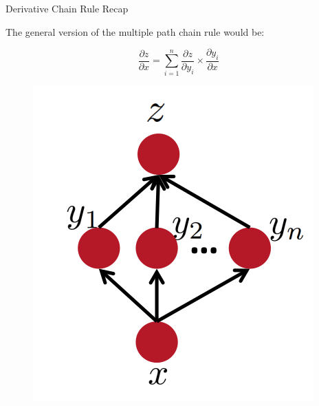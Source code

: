 \documentclass[handout]{beamer}
\begin{document}
\begin{frame}{Derivative Chain Rule Recap}

The general version of the multiple path chain rule would be:

\begin{displaymath}
 \frac{\partial z}{\partial x} = \sum_{i=1}^n \frac{\partial z}{\partial y_i} \times \frac{\partial y_i}{\partial x} 
\end{displaymath}


\begin{figure}[htb]
	\centering
	 \includegraphics[scale=0.4]{pics/multiple_paths_chain_rule_general.png}
\end{figure}


\end{frame}
\end{document}
